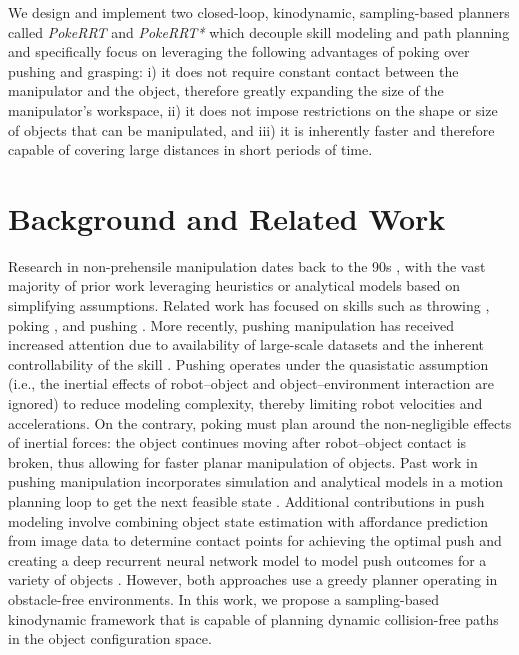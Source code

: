 We design and implement two closed-loop, kinodynamic, sampling-based planners called \textsl{PokeRRT} and \textsl{PokeRRT*} which decouple skill modeling and path planning and specifically focus on leveraging the following advantages of poking over pushing and grasping:
i) it does not require constant contact between the manipulator and the object, therefore greatly expanding the size of the manipulator's workspace,
ii) it does not impose restrictions on the shape or size of objects that can be manipulated, and
iii) it is inherently faster and therefore capable of covering large distances in short periods of time.

\section{Background and Related Work}
\label{poke:sec:background}

Research in non-prehensile manipulation dates back to the 90s \cite{lynch1999dynamic, ruggiero2018nonprehensile, toussaint2018differentiable}, with the vast majority of prior work leveraging heuristics or analytical models based on simplifying assumptions. Related work has focused on skills such as throwing \cite{zeng2020tossingbot}, poking \cite{Huang-1997-14452}, and pushing \cite{woodruff2017planning,RSS2020Changkyu,mason1986mechanics}.
More recently, pushing manipulation has received increased attention due to availability of large-scale datasets and the inherent controllability of the skill \cite{bauza2019omnipush}. Pushing operates under the quasistatic assumption (i.e., the inertial effects of robot--object and object--environment interaction are ignored) to reduce modeling complexity, thereby limiting robot velocities and accelerations. On the contrary, poking must plan around the non-negligible effects of inertial forces: the object continues moving after robot--object contact is broken, thus allowing for faster planar manipulation of objects. Past work in pushing manipulation incorporates simulation and analytical models in a motion planning loop to get the next feasible state \cite{zito2012two,zhou2019pushing}. Additional contributions in push modeling involve combining object state estimation with affordance prediction from image data to determine contact points for achieving the optimal push \cite{kloss2020accurate} and creating a deep recurrent neural network model to model push outcomes for a variety of objects \cite{li2018push}. However, both approaches use a greedy planner operating in obstacle-free environments. In this work, we propose a sampling-based kinodynamic framework that is capable of planning dynamic collision-free paths in the object configuration space.

